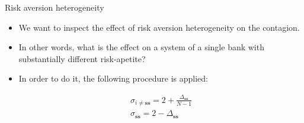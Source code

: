 \documentclass{beamer}
\begin{document}
\begin{frame}{Risk aversion heterogeneity}
    
    \begin{itemize}
        \item We want to inspect the effect of risk aversion heterogeneity on the contagion. 
        \item In other words, what is the effect on a system of a single bank with substantially different risk-apetite? 
        \item In order to do it, the following procedure is applied:
        
        \begin{equation}
            \begin{aligned}
              \sigma_{i \neq \textbf{ss}} = 2 + \frac{\Delta_{\textbf{ss}}}{N-1} \\ 
              \sigma_{\textbf{ss}} = 2 - \Delta_{\textbf{ss}}
            \end{aligned}\nonumber
        \end{equation}

    \end{itemize}

\end{frame}
\end{document}
